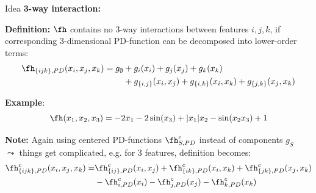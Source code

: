 \documentclass[10pt,compress,t,notes=noshow, xcolor=table]{beamer}
\begin{document}
\begin{framev}[align=top]{Idea }
\textbf{3-way interaction:}
\begin{itemizeM}
\item<+-> \textbf{Definition:} $\fh$ contains no 3-way interactions between features $i, j, k$, if corresponding 3-dimensional PD-function can be decomposed into lower-order terms:
\begin{align*}
\fh_{\{ijk\}, PD}(x_i, x_j, x_k)
= g_\emptyset
&+ g_i(x_i) + g_j(x_j) + g_k(x_k) \\
&+ g_{\{i,j\}}(x_i, x_j) + g_{\{i,k\}}(x_i, x_k) + g_{\{j,k\}}(x_j, x_k)
\end{align*}
\item<+-> \textbf{Example}:
$$
\fh(x_1, x_2, x_3) = - 2x_1 - 2\sin(x_3) + |x_1|x_2 - \sin(x_2 x_3) + 1
$$
\item<+-> \textbf{Note:} Again using centered PD-functions $\fh^c_{S, PD}$ instead of components $g_S$ \\
$\leadsto$ things get complicated, e.g. for 3 features, definition becomes:
\begin{align*}
\fh^c_{\{ijk\}, PD}(x_i, x_j, x_k)
= & \fh^c_{\{ij\}, PD}(x_i, x_j) + \fh^c_{\{ik\}, PD}(x_i, x_k) + \fh^c_{\{jk\}, PD}(x_j, x_k) \\
& - \fh^c_{i, PD}(x_i) - \fh^c_{j, PD}(x_j) - \fh^c_{k, PD}(x_k)
\end{align*}
\end{itemizeM}
\end{framev}
\end{document}
